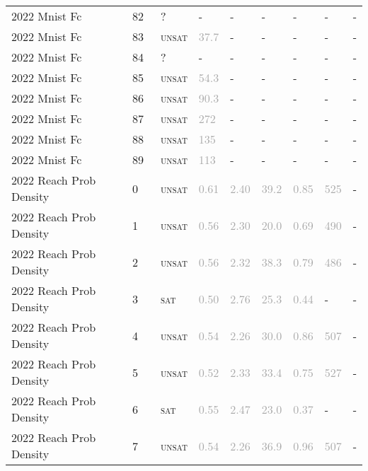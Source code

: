 \begin{center}
{\begin{longtable}{@{}lllllllll@{}}
2022 Mnist Fc & 82 & ~? & - & - & - & - & - & - \\
2022 Mnist Fc & 83 & ~\textsc{unsat} & \textcolor{darkgray}{37.7} & - & - & - & - & - \\
2022 Mnist Fc & 84 & ~? & - & - & - & - & - & - \\
2022 Mnist Fc & 85 & ~\textsc{unsat} & \textcolor{darkgray}{54.3} & - & - & - & - & - \\
2022 Mnist Fc & 86 & ~\textsc{unsat} & \textcolor{darkgray}{90.3} & - & - & - & - & - \\
2022 Mnist Fc & 87 & ~\textsc{unsat} & \textcolor{darkgray}{272} & - & - & - & - & - \\
2022 Mnist Fc & 88 & ~\textsc{unsat} & \textcolor{darkgray}{135} & - & - & - & - & - \\
2022 Mnist Fc & 89 & ~\textsc{unsat} & \textcolor{darkgray}{113} & - & - & - & - & - \\
\midrule
2022 Reach Prob Density & 0 & ~\textsc{unsat} & \textcolor{darkgray}{0.61} & \textcolor{darkgray}{2.40} & \textcolor{darkgray}{39.2} & \textcolor{darkgray}{0.85} & \textcolor{darkgray}{525} & - \\
2022 Reach Prob Density & 1 & ~\textsc{unsat} & \textcolor{darkgray}{0.56} & \textcolor{darkgray}{2.30} & \textcolor{darkgray}{20.0} & \textcolor{darkgray}{0.69} & \textcolor{darkgray}{490} & - \\
2022 Reach Prob Density & 2 & ~\textsc{unsat} & \textcolor{darkgray}{0.56} & \textcolor{darkgray}{2.32} & \textcolor{darkgray}{38.3} & \textcolor{darkgray}{0.79} & \textcolor{darkgray}{486} & - \\
2022 Reach Prob Density & 3 & ~\textsc{sat} & \textcolor{darkgray}{0.50} & \textcolor{darkgray}{2.76} & \textcolor{darkgray}{25.3} & \textcolor{darkgray}{0.44} & - & - \\
2022 Reach Prob Density & 4 & ~\textsc{unsat} & \textcolor{darkgray}{0.54} & \textcolor{darkgray}{2.26} & \textcolor{darkgray}{30.0} & \textcolor{darkgray}{0.86} & \textcolor{darkgray}{507} & - \\
2022 Reach Prob Density & 5 & ~\textsc{unsat} & \textcolor{darkgray}{0.52} & \textcolor{darkgray}{2.33} & \textcolor{darkgray}{33.4} & \textcolor{darkgray}{0.75} & \textcolor{darkgray}{527} & - \\
2022 Reach Prob Density & 6 & ~\textsc{sat} & \textcolor{darkgray}{0.55} & \textcolor{darkgray}{2.47} & \textcolor{darkgray}{23.0} & \textcolor{darkgray}{0.37} & - & - \\
2022 Reach Prob Density & 7 & ~\textsc{unsat} & \textcolor{darkgray}{0.54} & \textcolor{darkgray}{2.26} & \textcolor{darkgray}{36.9} & \textcolor{darkgray}{0.96} & \textcolor{darkgray}{507} & - \\

\end{longtable}}
\end{center}
